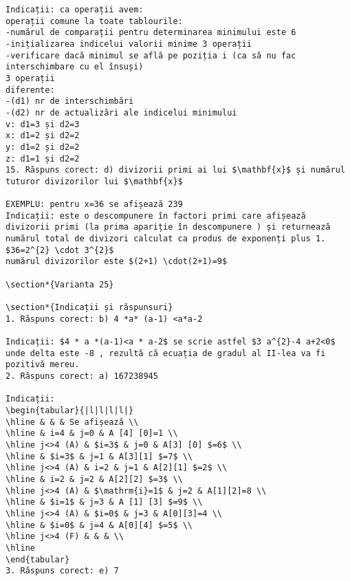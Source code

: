 \begin{verbatim}
Indicații: ca operații avem:
operații comune la toate tablourile:
-numărul de comparații pentru determinarea minimului este 6
-inițializarea indicelui valorii minime 3 operații
-verificare dacă minimul se află pe poziția i (ca să nu fac interschimbare cu el însuși)
3 operații
diferente:
-(d1) nr de interschimbări
-(d2) nr de actualizări ale indicelui minimului
v: d1=3 și d2=3
x: d1=2 și d2=2
y: d1=2 și d2=2
z: d1=1 și d2=2
15. Răspuns corect: d) divizorii primi ai lui $\mathbf{x}$ și numărul tuturor divizorilor lui $\mathbf{x}$

EXEMPLU: pentru x=36 se afișează 239
Indicații: este o descompunere în factori primi care afișează divizorii primi (la prima apariție în descompunere ) și returnează numărul total de divizori calculat ca produs de exponenți plus 1.
$36=2^{2} \cdot 3^{2}$
numărul divizorilor este $(2+1) \cdot(2+1)=9$

\section*{Varianta 25}

\section*{Indicații și răspunsuri}
1. Răspuns corect: b) 4 *a* (a-1) <a*a-2

Indicații: $4 * a *(a-1)<a * a-2$ se scrie astfel $3 a^{2}-4 a+2<0$ unde delta este -8 , rezultă că ecuația de gradul al II-lea va fi pozitivă mereu.
2. Răspuns corect: a) 167238945

Indicații:
\begin{tabular}{|l|l|l|l|}
\hline & & & Se afișează \\
\hline & i=4 & j=0 & A [4] [0]=1 \\
\hline j<>4 (A) & $i=3$ & j=0 & A[3] [0] $=6$ \\
\hline & $i=3$ & j=1 & A[3][1] $=7$ \\
\hline j<>4 (A) & i=2 & j=1 & A[2][1] $=2$ \\
\hline & i=2 & j=2 & A[2][2] $=3$ \\
\hline j<>4 (A) & $\mathrm{i}=1$ & j=2 & A[1][2]=8 \\
\hline & $i=1$ & j=3 & A [1] [3] $=9$ \\
\hline j<>4 (A) & $i=0$ & j=3 & A[0][3]=4 \\
\hline & $i=0$ & j=4 & A[0][4] $=5$ \\
\hline j<>4 (F) & & & \\
\hline
\end{tabular}
3. Răspuns corect: e) 7


\end{verbatim}
